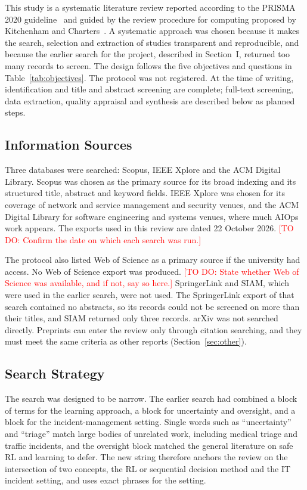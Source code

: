 \documentclass[journal]{IEEEtran}
\newcommand{\todo}[1]{\textcolor{red}{[TO DO: #1]}}
\begin{document}
This study is a systematic literature review reported according to the PRISMA 2020 guideline~\cite{page2021} and guided by the review procedure for computing proposed by Kitchenham and Charters~\cite{kitchenham2007}. A systematic approach was chosen because it makes the search, selection and extraction of studies transparent and reproducible, and because the earlier search for the project, described in Section~I, returned too many records to screen. The design follows the five objectives and questions in Table~\ref{tab:objectives}. The protocol was not registered. At the time of writing, identification and title and abstract screening are complete; full-text screening, data extraction, quality appraisal and synthesis are described below as planned steps.

\subsection{Information Sources}

Three databases were searched: Scopus, IEEE Xplore and the ACM Digital Library. Scopus was chosen as the primary source for its broad indexing and its structured title, abstract and keyword fields. IEEE Xplore was chosen for its coverage of network and service management and security venues, and the ACM Digital Library for software engineering and systems venues, where much AIOps work appears. The exports used in this review are dated 22 October 2026. \todo{Confirm the date on which each search was run.}

The protocol also listed Web of Science as a primary source if the university had access. No Web of Science export was produced. \todo{State whether Web of Science was available, and if not, say so here.} SpringerLink and SIAM, which were used in the earlier search, were not used. The SpringerLink export of that search contained no abstracts, so its records could not be screened on more than their titles, and SIAM returned only three records. arXiv was not searched directly. Preprints can enter the review only through citation searching, and they must meet the same criteria as other reports (Section~\ref{sec:other}).

\subsection{Search Strategy}

The search was designed to be narrow. The earlier search had combined a block of terms for the learning approach, a block for uncertainty and oversight, and a block for the incident-management setting. Single words such as ``uncertainty'' and ``triage'' match large bodies of unrelated work, including medical triage and traffic incidents, and the oversight block matched the general literature on safe RL and learning to defer. The new string therefore anchors the review on the intersection of two concepts, the RL or sequential decision method and the IT incident setting, and uses exact phrases for the setting.
\end{document}
